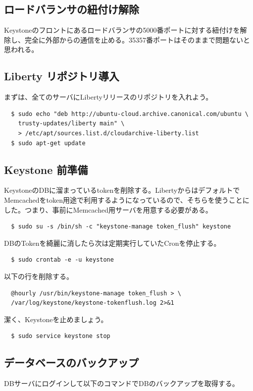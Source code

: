 \documentclass[9pt,b5paper,tombo,openany]{jsbook}
\begin{document}
\subsection{ロードバランサの紐付け解除}
Keystoneのフロントにあるロードバランサの5000番ポートに対する紐付けを解除し、完全に外部からの通信を止める。35357番ポートはそのままで問題ないと思われる。

\subsection{Liberty リポジトリ導入}
\noindent
まずは、全てのサーバにLibertyリリースのリポジトリを入れよう。

\begin{lstlisting}
  $ sudo echo "deb http://ubuntu-cloud.archive.canonical.com/ubuntu \
    trusty-updates/liberty main" \
    > /etc/apt/sources.list.d/cloudarchive-liberty.list
  $ sudo apt-get update
\end{lstlisting}

\subsection{Keystone 前準備}
KeystoneのDBに溜まっているtokenを削除する。LibertyからはデフォルトでMemcachedをtoken用途で利用するようになっているので、そちらを使うことにした。つまり、事前にMemcached用サーバを用意する必要がある。

\begin{lstlisting}
  $ sudo su -s /bin/sh -c "keystone-manage token_flush" keystone
\end{lstlisting}

\noindent
DBのTokenを綺麗に消したら次は定期実行していたCronを停止する。

\begin{lstlisting}
  $ sudo crontab -e -u keystone
\end{lstlisting}

\noindent
以下の行を削除する。

\begin{lstlisting}
  @hourly /usr/bin/keystone-manage token_flush > \
  /var/log/keystone/keystone-tokenflush.log 2>&1
\end{lstlisting}

\noindent
潔く、Keystoneを止めましょう。

\begin{lstlisting}
  $ sudo service keystone stop
\end{lstlisting}

\subsection{データベースのバックアップ}
\noindent
DBサーバにログインして以下のコマンドでDBのバックアップを取得する。
\end{document}
